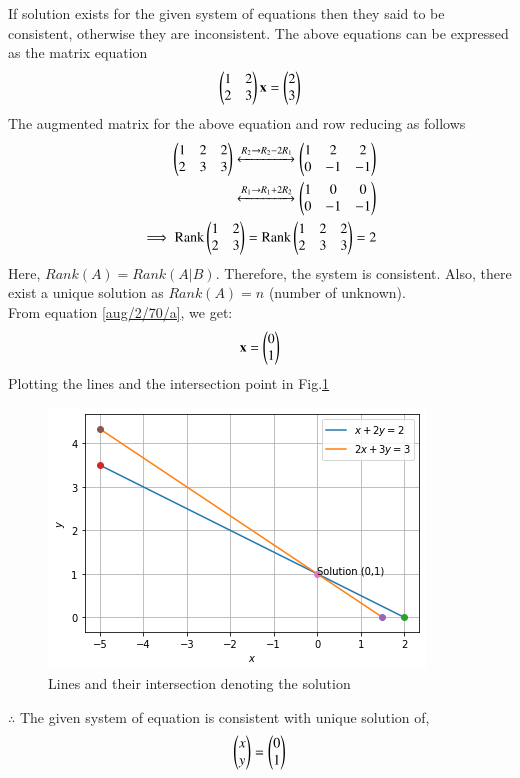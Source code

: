 %
If solution exists for the given
system of equations then they
said to be consistent, otherwise they are
inconsistent.
The above equations can be expressed as the matrix equation
\begin{align}
\begin{pmatrix}1 & 2\\2 & 3\end{pmatrix} \mathbf{x} = \begin{pmatrix}2\\3\end{pmatrix}
\end{align}
%
The augmented matrix for the above equation and row reducing as follows
\begin{align}
\begin{pmatrix}1 & 2 & 2 \\ 2 & 3 & 3\end{pmatrix}  \xleftrightarrow[]{R_2\rightarrow R_2-2R_1} \begin{pmatrix}1 & 2 & 2 \\ 0 & -1 & -1\end{pmatrix}\\
\xleftrightarrow[]{R_1\rightarrow R_1+2R_2}
\begin{pmatrix}1 & 0 & 0\\0 & -1 & -1\end{pmatrix}\label{aug/2/70/a}\\
\implies\text{Rank}\begin{pmatrix}1&2\\2&3\end{pmatrix}=\text{Rank}\begin{pmatrix}1&2&2\\2&3&3\end{pmatrix}=2
\end{align}
Here, $Rank(A)=Rank(A|B)$. Therefore, the system is consistent. Also, there exist a unique solution as $Rank(A)=n$ (number of unknown).\\ 
From equation \eqref{aug/2/70/a}, we get:
\begin{align}
    \mathbf{x}=\begin{pmatrix}0\\1\end{pmatrix}
\end{align}
Plotting the lines and the intersection point in Fig.\ref{aug/2/70/b}
\begin{figure}[htp]
\centering
\includegraphics[width=\columnwidth]{solutions/aug/2/70/a_2.png}
\caption{Lines and their intersection denoting the solution}
\label{aug/2/70/b}
\end{figure}
%
$\therefore$ The given system of equation is consistent with unique solution of,
$$\begin{pmatrix}x\\y\end{pmatrix}=\begin{pmatrix}0\\1\end{pmatrix}$$

